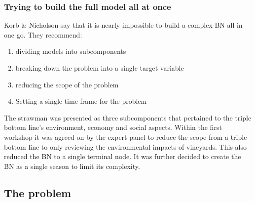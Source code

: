 \subsubsection{Trying to build the full model all at once}
Korb & Nicholson say that it is nearly impossible to build a complex BN all in one go. They recommend:
\begin{enumerate}
        \item dividing models into subcomponents
        \item breaking down the problem into a single target variable
        \item reducing the scope of the problem
        \item Setting a single time frame for the problem
\end{enumerate}
The strawman was presented as three subcomponents that pertained to the triple bottom line's environment, economy and social aspects.
Within the first workshop it was agreed on by the expert panel to reduce the scope from a triple bottom line to only reviewing the environmental impacts of vineyards. This also reduced the BN to a single terminal node. It was further decided to create the BN as a single season to limit its complexity.

\subsection{The problem}
